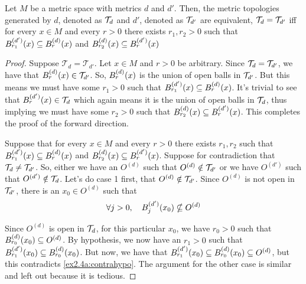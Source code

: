 \documentclass{article}
\begin{document}
\begin{importantthm}
\label{thm:ex2.4a}
Let $M$ be a metric space with metrics $d$ and $d'$. Then, the metric topologies 
generated by $d$, denoted as $\mathcal{T}_d$ and $d'$, denoted as $\mathcal{T}_{d'}$
are equivalent, $\mathcal{T}_d = \mathcal{T}_{d'}$ iff for every $x \in M$ and every $r > 0$
there exists $r_1, r_2 > 0$ such that $ B_{r_1}^{(d')} (x)  \subseteq  B_{r}^{(d)} (x) $ and
$ B_{r_2}^{(d)} (x)  \subseteq  B_{r}^{(d')} (x) $
\end{importantthm}
\begin{proof}
\forwarddir Suppose $\mathcal{T}_d = \mathcal{T}_{d'}$. Let $x \in M$ and $r > 0$ be arbitrary.
Since $\mathcal{T}_d = \mathcal{T}_{d'}$, we have that $ B_{r}^{(d)} (x)  \in \mathcal{T}_{d'}$. So, $ B_{r}^{(d)} (x) $
is the union of open balls in $\mathcal{T}_{d'}$. But this means we must have some $r_1 > 0$ such that $ B_{r_1}^{(d')} (x)  \subseteq  B_{r}^{(d)} (x) $. It's trivial to see that
$ B_{r}^{(d')} (x)  \in \mathcal{T}_d$ which again means it is the union of open balls in $\mathcal{T}_d$,
thus implying we must have some $r_2 > 0$ such that $ B_{r_2}^{(d)} (x)  \subseteq  B_{r}^{(d')} (x) $. 
 This completes the proof of the forward direction.


\conversedir  Suppose that for every $x \in M$ and every $r > 0$
there exists $r_1, r_2$ such that $ B_{r_1}^{(d')} (x)  \subseteq  B_{r}^{(d)} (x) $ and
$ B_{r_2}^{(d)} (x)  \subseteq  B_{r}^{(d')} (x) $. Suppose for contradiction that $\mathcal{T}_d \neq \mathcal{T}_{d'}$. So, either we have an $O^{(d)}$ such that $O^{(d)} \notin \mathcal{T}_{d'}$ or we have
$O^{(d')}$ such that $O^{(d')} \notin \mathcal{T}_d$. Let's do case 1 first, that $O^{(d)} \notin \mathcal{T}_{d'}$. 
Since $O^{(d)}$ is not open in $\mathcal{T}_{d'}$, there is an $x_0 \in O^{(d)}$ such that 
\begin{align}
\label{ex2.4a:contrahypo}
    \forall j > 0, \quad  B_{j}^{(d')} (x_0)  \nsubseteq O^{(d)}
\end{align}


Since $O^{(d)}$ is open in $\mathcal{T}_d$, for this particular $x_0$, we have $r_0 > 0$ such that $ B_{r_0}^{(d)} (x_0)  \subseteq O^{(d)}$. 
By hypothesis, we now have an $r_1 > 0$ such that $ B_{r_1}^{(d')} (x_0)  \subseteq  B_{r_0}^{(d)} (x_0) $.
But now, we have that $ B_{r_1}^{(d')} (x_0)  \subseteq  B_{r_0}^{(d)} (x_0)  \subseteq O^{(d)}$, but this contradicts \cref{ex2.4a:contrahypo}. The argument for the other case is similar 
and left out because it is tedious.
\end{proof}
\end{document}
